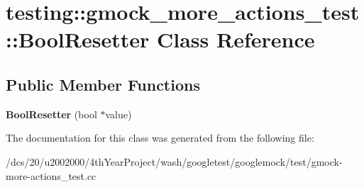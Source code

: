 \hypertarget{classtesting_1_1gmock__more__actions__test_1_1BoolResetter}{}\section{testing\+:\+:gmock\+\_\+more\+\_\+actions\+\_\+test\+:\+:Bool\+Resetter Class Reference}
\label{classtesting_1_1gmock__more__actions__test_1_1BoolResetter}
\subsection*{Public Member Functions}
\begin{DoxyCompactItemize}
\item 
\mbox{\label{classtesting_1_1gmock__more__actions__test_1_1BoolResetter_aa9f2b7c0f12dd3b9732672e9ace9ae84}} 
{\bfseries Bool\+Resetter} (bool $\ast$value)
\end{DoxyCompactItemize}


The documentation for this class was generated from the following file\+:\begin{DoxyCompactItemize}
\item 
/dcs/20/u2002000/4th\+Year\+Project/wash/googletest/googlemock/test/gmock-\/more-\/actions\+\_\+test.\+cc\end{DoxyCompactItemize}
